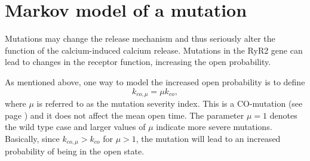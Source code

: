 \section{Markov model of a mutation}

Mutations may change the release mechanism and thus seriously alter the
function of the calcium-induced calcium release. Mutations in the RyR2
gene can lead to changes in the receptor function, increasing the open
probability. 

As mentioned above, one way to model the increased open probability
is to define
\begin{equation}
k_{co,\mu}=\mu k_{co}, \label{severity}
\end{equation}
where $\mu$ is referred to as the mutation severity index. This is a
CO-mutation (see page \pageref{com}) and it does not affect the mean open
time. The parameter $\mu=1$ denotes the wild type case and larger values of
$\mu$ indicate more severe mutations. Basically, since $k_{co,\mu}>k_{co} $
for $\mu>1$, the mutation will lead to an increased probability of being in the
open state.

